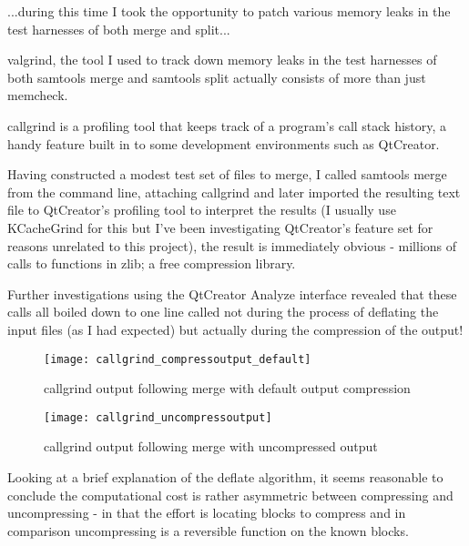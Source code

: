 ...during this time I took the opportunity to patch various memory leaks in the
test harnesses of both merge and split...

valgrind, the tool I used to track down memory leaks in the test harnesses of
both samtools merge and samtools split actually consists of more than just
memcheck.

callgrind is a profiling tool that keeps track of a program’s call stack
history, a handy feature built in to some development environments such as
QtCreator.

Having constructed a modest test set of files to merge, I called samtools merge
from the command line, attaching callgrind and later imported the resulting
text file to QtCreator’s profiling tool to interpret the results (I usually use
KCacheGrind for this but I’ve been investigating QtCreator’s feature set for
reasons unrelated to this project), the result is immediately obvious -
millions of calls to functions in zlib; a free compression library.

Further investigations using the QtCreator Analyze interface revealed that
these calls all boiled down to one line called not during the process of
deflating the input files (as I had expected) but actually during the
compression of the output!

\begin{figure}[htbp!]
    \centering
    \texttt{[image: callgrind\_compressoutput\_default]}
    \caption[callgrind-default]{callgrind output following merge with default
    output compression}
    \label{fig:callgrind-default}
\end{figure}

\begin{figure}[htbp!]
    \centering
    \texttt{[image: callgrind\_uncompressoutput]}
    \caption[callgrind-uncompressed]{callgrind output following merge with
    uncompressed output}
    \label{fig:callgrind-uncompressed}
\end{figure}

Looking at a brief explanation of the deflate algorithm, it seems reasonable to
conclude the computational cost is rather asymmetric between compressing and
uncompressing - in that the effort is locating blocks to compress and in
comparison uncompressing is a reversible function on the known blocks.

